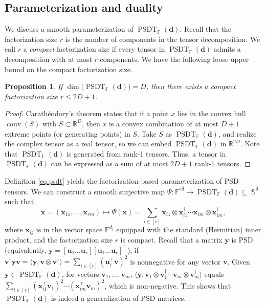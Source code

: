 \documentclass[smallextended]{svjour3}
\newtheorem{proposition}{Proposition}
\newcommand{\R}{\mathbb R}
\newcommand{\F}{\mathbb F}
\DeclareMathOperator{\conv}{conv}
\DeclareMathOperator{\SOST}{PSDT}
\newcommand{\1}{\mathbf{1}}
\newcommand{\x}{\mathbf{x}}
\newcommand{\y}{\mathbf{y}}
\renewcommand{\u}{\mathbf{u}}
\renewcommand{\v}{\mathbf{v}}
\DeclareMathOperator{\herm}{\mathbb{S}}
\DeclareMathOperator{\mtens}{\otimes}
\newcommand{\inner}[2]{\langle #1, #2 \rangle}
\newcommand{\vc}[1]{\mathbf{#1}}
\newcommand{\vd}{\vc{d}}
\begin{document}
\subsection{Parameterization and duality}

We discuss a smooth parameterization of $\SOST_{\F}(\vd)$. Recall that the factorization size $r$ is the number of components in the tensor decomposition. We call $r$ a \textit{compact} factorization size if every tensor in $\SOST_{\F}(\vd)$ admits a decomposition with at most $r$ components. We have the following loose upper bound on the compact factorization size.
\begin{proposition}
    \label{prop.compact}
    If $\dim\bigl(\SOST_{\F}(\vd)\bigr)=D$, then there exists a compact factorization size $r\le 2D+1$.
    \end{proposition}
    \begin{proof}
        Carathéodory's theorem states that if a point $x$   lies in the convex hull $\conv(S)$ with $S \subset \R^{D}$, then  $x$ is a convex combination of at most $D+1$ extreme points (or generating points) in $S$. Take $S$ as $\SOST_{\F}(\vd)$, and realize the complex tensor as a real tensor, so we can embed $\SOST_{\F}(\vd)$ in $\R^{2D}$. Note that $\SOST_{\F}(\vd)$ is generated from rank-1 tensors. Thus, a tensor in $\SOST_{\F}(\vd)$ can be expressed as a sum of at most $2D+1$ rank-1 tensors.
    \end{proof}

   Definition \eqref{eq.psdt} yields the factorization-based parameterization of PSD tensors. We can construct a smooth surjective map $\Psi: \F^{r\bar{d}} \to \SOST_{\F}(\vd) \subseteq \herm^{\bar{d}}$ such that
   \begin{equation}
    \label{eq.lift}
    \x  = (\x_{11}, \dots, \x_{rm}) \mapsto \Psi(\x) = \sum_{i \in [r]}  \x_{i1} \mtens \x_{i1}^\dagger \cdots \x_{im} \mtens \x_{im}^\dagger,
   \end{equation}
   where $\x_{ij} $ is in the vector space $\F^{d_j}$ equipped with the standard (Hermitian) inner product, and the factorization size $r$ is compact. Recall that a matrix $\y$ is PSD (equivalently, $\y = [\u_1\dots \u_r] [\u_1\dots \u_r]^\top$), if $\v^\dagger \y \v = \inner{\y}{\v\mtens \v^\dagger} = \sum_{i \in [r]} (\u_i^\top \v)^2$ is nonnegative for any vector $\v$. Given  $\y \in \SOST_{\F}(\vd)$, for vectors $\v_{1}, \dots, \v_{m}$, $\inner{\y}{ \v_{1} \mtens \v_{1}^\dagger \cdots \v_{m} \mtens \v_{m}^\dagger}$ equals $\sum_{i \in [r]}(\x_{i1}^\top \v_{1})^2\cdots(\x_{im}^\top \v_{m})^2$, which is non-negative.  This shows that $\SOST_{\F}(\vd)$ is indeed a generalization of PSD matrices.
\end{document}
